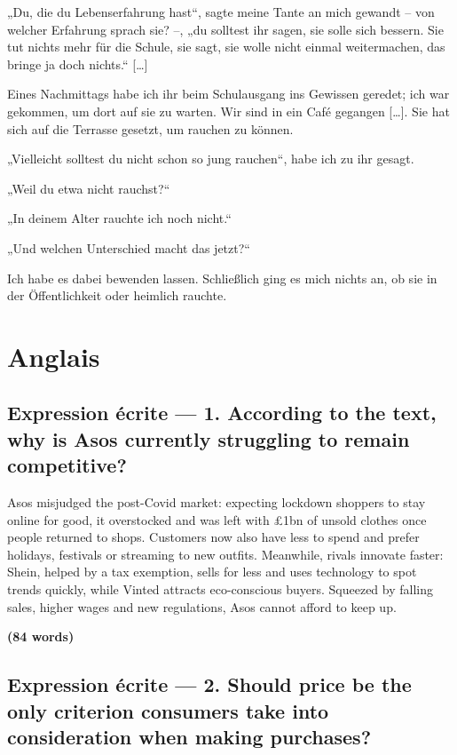 \documentclass[11pt,a4paper]{article}
\begin{document}
„Du, die du Lebenserfahrung hast``, sagte meine Tante an mich gewandt -- von welcher Erfahrung sprach sie? --, „du solltest ihr sagen, sie solle sich bessern. Sie tut nichts mehr für die Schule, sie sagt, sie wolle nicht einmal weitermachen, das bringe ja doch nichts.`` {[}\ldots{]}

Eines Nachmittags habe ich ihr beim Schulausgang ins Gewissen geredet; ich war gekommen, um dort auf sie zu warten. Wir sind in ein Café gegangen {[}\ldots{]}. Sie hat sich auf die Terrasse gesetzt, um rauchen zu können.

„Vielleicht solltest du nicht schon so jung rauchen``, habe ich zu ihr gesagt.

„Weil du etwa nicht rauchst?{}``

„In deinem Alter rauchte ich noch nicht.``

„Und welchen Unterschied macht das jetzt?{}``

Ich habe es dabei bewenden lassen. Schließlich ging es mich nichts an, ob sie in der Öffentlichkeit oder heimlich rauchte.

\hypertarget{anglais}{%
\section{Anglais}\label{anglais}}

\hypertarget{expression-uxe9crite-1.-according-to-the-text-why-is-asos-currently-struggling-to-remain-competitive}{%
\subsection{Expression écrite --- 1. According to the text, why is Asos currently struggling to remain competitive?}\label{expression-uxe9crite-1.-according-to-the-text-why-is-asos-currently-struggling-to-remain-competitive}}

Asos misjudged the post-Covid market: expecting lockdown shoppers to stay online for good, it overstocked and was left with £1bn of unsold clothes once people returned to shops. Customers now also have less to spend and prefer holidays, festivals or streaming to new outfits. Meanwhile, rivals innovate faster: Shein, helped by a tax exemption, sells for less and uses technology to spot trends quickly, while Vinted attracts eco-conscious buyers. Squeezed by falling sales, higher wages and new regulations, Asos cannot afford to keep up.

\textbf{(84 words)}

\hypertarget{expression-uxe9crite-2.-should-price-be-the-only-criterion-consumers-take-into-consideration-when-making-purchases}{%
\subsection{Expression écrite --- 2. Should price be the only criterion consumers take into consideration when making purchases?}\label{expression-uxe9crite-2.-should-price-be-the-only-criterion-consumers-take-into-consideration-when-making-purchases}}
\end{document}
